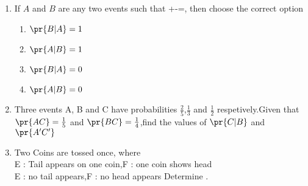 \begin{enumerate}[label=\thesection.\arabic*,ref=\thesection.\theenumi]
\solution
%
	\item If $A$ and $B$ are any two events such that +-=, then choose the correct option
\begin{enumerate}
\item  $\pr{B|A}=1$
\item $\pr{A|B}=1$
	\label{prob:12/13/6/19}
\item $\pr{B|A}=0$
\item $\pr{A|B}=0$
\end{enumerate}
		\solution
\item Three events A, B and C have probabilities $\frac{2}{5}$,$\frac{1}{3}$ and $\frac{1}{2}$ respetively.Given that $\pr{AC}=\frac{1}{5}$ and $\pr{BC}=\frac{1}{4}$,find the values of $\pr{C | B}$ and $\pr{A^{\prime} C^{\prime}}$\\
\solution
%
\item Two Coins are tossed once, where\\
 E : Tail appears on one coin,\qquad F : one coin shows head\\
  E : no tail appears,\qquad\qquad\qquad F : no head appears
Determine .
%
%
\end{enumerate}
